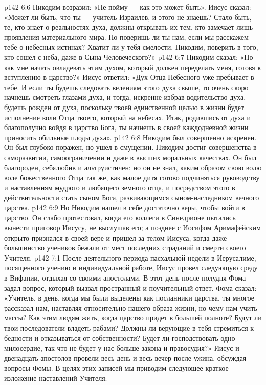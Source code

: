 \vs p142 6:6 Никодим возразил: «Не пойму --- как это может быть». Иисус сказал: «Может ли быть, что ты --- учитель Израилев, и этого не знаешь? Стало быть, те, кто знает о реальностях духа, должны открывать их тем, кто замечает лишь проявления материального мира. Но поверишь ли ты нам, если мы расскажем тебе о небесных истинах? Хватит ли у тебя смелости, Никодим, поверить в того, кто сошел с неба, даже в Сына Человеческого?»
\vs p142 6:7 Никодим сказал: «Но как мне начать овладевать этим духом, который должен переделать меня, готовя к вступлению в царство?» Иисус ответил: «Дух Отца Небесного уже пребывает в тебе. И если ты будешь следовать велениям этого духа свыше, то очень скоро начнешь смотреть глазами духа, и тогда, искренне избрав водительство духа, будешь рожден от духа, поскольку твоей единственной целью в жизни будет исполнение воли Отца твоего, который на небесах. Итак, родившись от духа и благополучно войдя в царство Бога, ты начнешь в своей каждодневной жизни приносить обильные плоды духа».
\vs p142 6:8 Никодим был совершенно искренен. Он был глубоко поражен, но ушел в смущении. Никодим достиг совершенства в саморазвитии, самоограничении и даже в высших моральных качествах. Он был благороден, себялюбив и альтруистичен; но он не знал, каким образом  свою волю воле божественного Отца так же, как малое дитя готово подчиняться руководству и наставлениям мудрого и любящего земного отца, и посредством этого в действительности стать сыном Бога, развивающимся сыном\hyp{}наследником вечного царства.
\vs p142 6:9 Но Никодим нашел в себе достаточно веры, чтобы войти в царство. Он слабо протестовал, когда его коллеги в Синедрионе пытались вынести приговор Иисусу, не выслушав его; а позднее с Иосифом Аримафейским открыто признался в своей вере и пришел за телом Иисуса, когда даже большинство учеников бежали от мест последних страданий и смерти своего Учителя.
\vs p142 7:1 После деятельного периода пасхальной недели в Иерусалиме, посященного учению и индивидуальной работе, Иисус провел следующую среду в Вифании, отдыхая со своими апостолами. В этот день после полудня Фома задал вопрос, который вызвал пространный и поучительный ответ. Фома сказал: «Учитель, в день, когда мы были выделены как посланники царства, ты многое рассказал нам, наставляя относительно нашего образа жизни, но чему нам учить массы? Как этим людям жить, когда царство придет в большей полноте? Будут ли твои последователи владеть рабами? Должны ли верующие в тебя стремиться к бедности и отказываться от собственности? Будет ли господствовать одно милосердие, так что не будет у нас больше закона и правосудия?» Иисус и двенадцать апостолов провели весь день и весь вечер после ужина, обсуждая вопросы Фомы. В целях этих записей мы приводим следующее краткое изложение наставлений Учителя:
